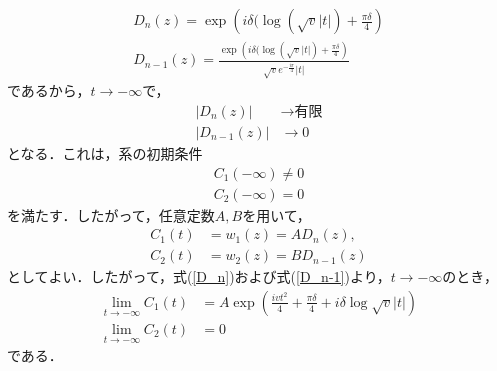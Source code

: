 \documentclass[a4paper, titlepage]{jsreport}
\begin{document}
\begin{align}
  D_n(z) = \exp \left( i\delta (\log (\sqrt{v} |t|) + \frac{\pi \delta}{4} \right) \label{D_n}\\
  D_{n-1}(z) = \frac{\exp \left( i\delta (\log (\sqrt{v} |t|) + \frac{\pi \delta}{4} \right)}{\sqrt{v} e^{-\frac{i\pi}{4}} |t|} \label{D_n-1}
\end{align}
であるから，$t \rightarrow -\infty$で，
\begin{align}
  |D_n(z)| &\rightarrow \text{有限}\\
  |D_{n-1}(z)| &\rightarrow 0
\end{align}
となる．これは，系の初期条件
\begin{align}
  C_1(-\infty) \ne 0\\
  C_2(-\infty) = 0
\end{align}
を満たす．したがって，任意定数$A,B$を用いて，
\begin{align}
  C_1(t) &= w_1(z) = A D_n(z),\\
  C_2(t) &= w_2(z) = B D_{n-1}(z)
\end{align}
としてよい．したがって，式(\ref{D_n})および式(\ref{D_n-1})より，$t \rightarrow -\infty$のとき，
\begin{align}
  \lim_{t \rightarrow -\infty} C_1(t) &= A \exp \left( \frac{ivt^2}{4} + \frac{\pi \delta}{4} + i\delta \log \sqrt{v} |t| \right) \label{C1_inf}\\
  \lim_{t \rightarrow -\infty} C_2(t) &= 0
\end{align}
である．
\end{document}
